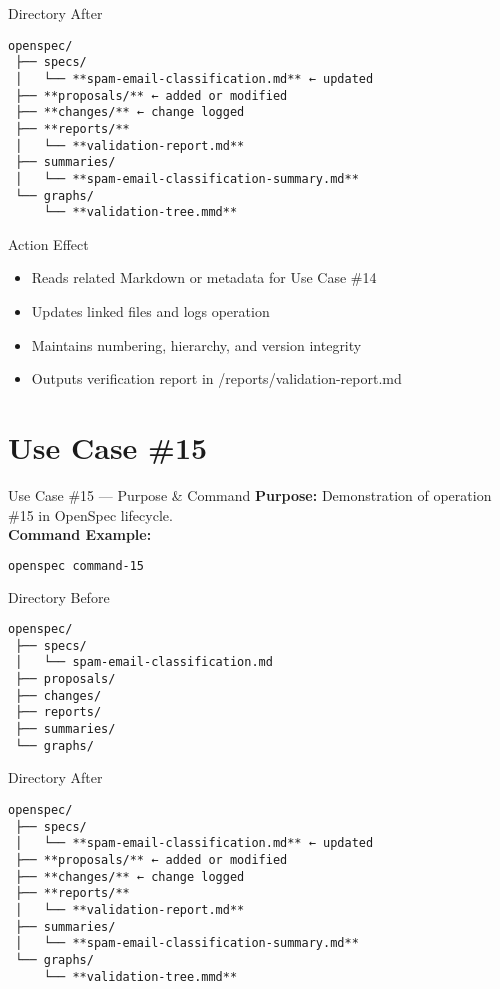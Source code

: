 \documentclass[aspectratio=169]{beamer}
\begin{document}
\begin{frame}{Directory After}
\begin{lstlisting}
openspec/
 ├── specs/
 │   └── **spam-email-classification.md** ← updated
 ├── **proposals/** ← added or modified
 ├── **changes/** ← change logged
 ├── **reports/**
 │   └── **validation-report.md**
 ├── summaries/
 │   └── **spam-email-classification-summary.md**
 └── graphs/
     └── **validation-tree.mmd**
\end{lstlisting}
\end{frame}

\begin{frame}{Action Effect}
\begin{itemize}
  \item Reads related Markdown or metadata for Use Case \#14
  \item Updates linked files and logs operation
  \item Maintains numbering, hierarchy, and version integrity
  \item Outputs verification report in /reports/validation-report.md
\end{itemize}
\end{frame}

\section*{Use Case \#15}
\begin{frame}{Use Case \#15 --- Purpose \& Command}
\textbf{Purpose:} Demonstration of operation \#15 in OpenSpec lifecycle.\\[4pt]
\textbf{Command Example:}
\begin{lstlisting}[language=bash]
openspec command-15
\end{lstlisting}
\end{frame}

\begin{frame}{Directory Before}
\begin{lstlisting}
openspec/
 ├── specs/
 │   └── spam-email-classification.md
 ├── proposals/
 ├── changes/
 ├── reports/
 ├── summaries/
 └── graphs/
\end{lstlisting}
\end{frame}

\begin{frame}{Directory After}
\begin{lstlisting}
openspec/
 ├── specs/
 │   └── **spam-email-classification.md** ← updated
 ├── **proposals/** ← added or modified
 ├── **changes/** ← change logged
 ├── **reports/**
 │   └── **validation-report.md**
 ├── summaries/
 │   └── **spam-email-classification-summary.md**
 └── graphs/
     └── **validation-tree.mmd**
\end{lstlisting}
\end{frame}
\end{document}
